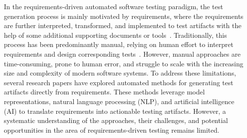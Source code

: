 
In the requirements-driven automated software testing paradigm, the test generation process is mainly motivated by requirements, where the requirements are further interpreted, transformed, and implemented to test artifacts with the help of some additional supporting documents or tools~\cite{mustafa2021automated,align_req_test_01}. Traditionally, this process has been predominantly manual, relying on human effort to interpret requirements and design corresponding tests~\cite{automated_test_ad_01,automated_test_ad_02}. However, manual approaches are time-consuming, prone to human error, and struggle to scale with the increasing size and complexity of modern software systems. To address these limitations, several research papers have explored automated methods for generating test artifacts directly from requirements. These methods leverage model representations, natural language processing (NLP), and artificial intelligence (AI) to translate requirements into actionable testing artifacts. However, a systematic understanding of the approaches, their challenges, and potential opportunities in the area of requirements-driven testing remains limited.

